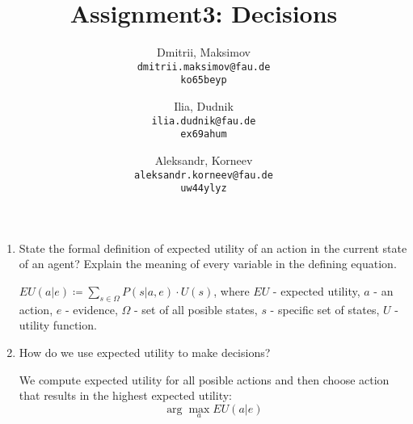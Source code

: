 \documentclass{homework}
\title{Assignment3: Decisions}
\author{
  Dmitrii, Maksimov\\
  \texttt{dmitrii.maksimov@fau.de} \\
  \texttt{ko65beyp}
  \and
  Ilia, Dudnik\\
  \texttt{ilia.dudnik@fau.de}\\
  \texttt{ex69ahum}
  \and
  Aleksandr, Korneev\\
  \texttt{aleksandr.korneev@fau.de}\\
  \texttt{uw44ylyz}
}
\begin{document}
\maketitle


\begin{enumerate}
	\item State the formal definition of expected utility of an action in the current state of an agent? Explain the meaning of every variable in the defining equation.

	$EU(a|e)\coloneqq \sum_{s\in\Omega} P(s|a, e)\cdot U(s)$, where $EU$ - expected utility, $a$ - an action, $e$ - evidence, $\Omega$ - set of all posible states, $s$ - specific set of states, $U$ - utility function.
	\item How do we use expected utility to make decisions?

	We compute expected utility for all posible actions and then choose action that results in the highest expected utility: \[\arg \max_{a} EU(a|e)\]
\end{enumerate}
\end{document}
